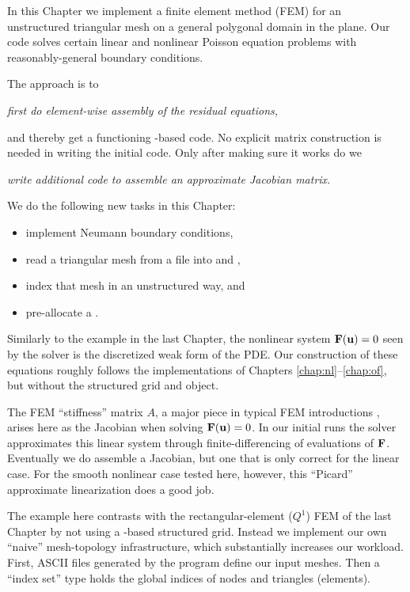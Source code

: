 
In this Chapter we implement a finite element method (FEM) for an unstructured triangular mesh on a general polygonal domain in the plane.  Our code solves certain linear and nonlinear Poisson equation problems with reasonably-general boundary conditions.

The approach is to
\begin{center}
\emph{first do element-wise assembly of the residual equations,}
\end{center}
and thereby get a functioning \pSNES-based code.  No explicit matrix construction is needed in writing the initial code.  Only after making sure it works do we
\begin{center}
\emph{write additional code to assemble an approximate Jacobian matrix.}
\end{center}

We do the following new tasks in this Chapter:
\begin{itemize}
\item implement Neumann boundary conditions,
\item read a triangular mesh from a file into \PETSc \pVecs and \pISs,
\item index that mesh in an unstructured way, and
\item pre-allocate a \PETSc \pMat.
\end{itemize}

Similarly to the example in the last Chapter, the nonlinear system $\mathbf{F}(\mathbf{u})=0$ seen by the \pSNES solver is the discretized weak form of the PDE.  Our construction of these equations roughly follows the implementations of Chapters \ref{chap:nl}--\ref{chap:of}, but without the structured grid and \pDMDA object.

The FEM ``stiffness'' matrix $A$, a major piece in typical FEM introductions \citep{Braess2007,Elmanetal2005}, arises here as the Jacobian when solving $\mathbf{F}(\mathbf{u})=0$.  In our initial runs the \pSNES solver approximates this linear system through finite-differencing of evaluations of $\mathbf{F}$.  Eventually we do assemble a Jacobian, but one that is only correct for the linear case.  For the smooth nonlinear case tested here, however, this ``Picard'' approximate linearization does a good job.

The example here contrasts with the rectangular-element ($Q^1$) FEM of the last Chapter by not using a \pDMDA-based structured grid.  Instead we implement our own ``naive'' mesh-topology infrastructure, which substantially increases our workload.  First, ASCII files generated by the \Triangle program define our input meshes.  Then a \PETSc \pIS ``index set'' type holds the global indices of nodes and triangles (elements).

